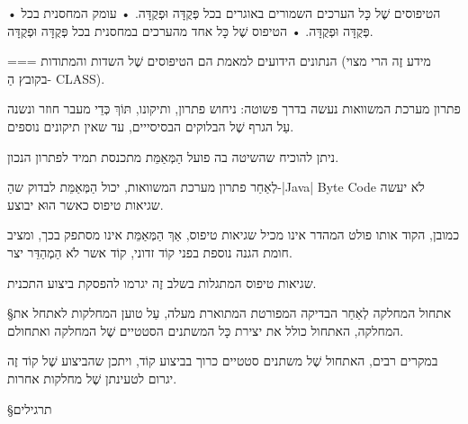 • הטיפוסים שֶׁל כָּל הערכים השמורים באוגרים בכל פְּקֻדָּה וּפְקֻדָּה.
• עומק המחסנית בכל פְּקֻדָּה וּפְקֻדָּה.
• הטיפוס שֶׁל כָּל אחד מהערכים במחסנית בכל פְּקֻדָּה וּפְקֻדָּה.

===
הנתונים הידועים למאמת הם הטיפוסים שֶׁל השדות והמתודות (מידע זֶה הרי מצוי בקובץ
הַ- CLASS).

פתרון מערכת המשוואות נעשה בדרך פשוטה: ניחוש פתרון, ותיקונו, תּוֹךְ כְּדֵי מעבר
חוזר ונשנה עַל הגרף שֶׁל הבלוקים הבסיסייים, עד שאין תיקונים נוספים.

ניתן להוכיח שהשיטה בה פועל הַמְּאַמֵּת מתכנסת תמיד לפתרון הנכון.

לְאַחַר פתרון מערכת המשוואות, יכול הַמְּאַמֵּת לבדוק שהַ-|Java| Byte Code לֹא יעשה
שגיאות טיפוס כאשר הוּא יבוצע.

כמובן, הקוד אותו פולט המהדר אינו מכיל שגיאות טיפוס, אַךְ הַמְּאַמֵּת אינו
מסתפק בכך, ומציב חומת הגנה נוספת בפני קוֹד זדוני, קוֹד אשר לֹא הַמְהַדֵּר
יצר.

שגיאות טיפוס המתגלות בשלב זֶה יגרמו להפסקת ביצוע התכנית.

§אתחול המחלקה
לְאַחַר הבדיקה המפורטת המתוארת מעלה, עַל טוען המחלקות לאתחל את
המחלקה, האתחול כולל את יצירת כָּל המשתנים הסטטיים שֶׁל המחלקה
ואתחולם.

במקרים רבים, האתחול שֶׁל משתנים סטטיים כרוך בביצוע קוֹד, ויתכן שהביצוע שֶׁל קוֹד
זֶה יגרום לטעינתן שֶׁל מחלקות אחרות.

§תרגילים

